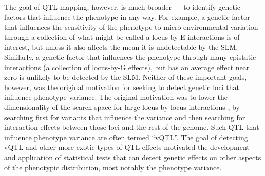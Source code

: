 
The goal of QTL mapping, however, is much broader --- to identify genetic factors that influence the phenotype in any way.
For example, a genetic factor that influences the sensitivity of the phenotype to micro-environmental variation through a collection of what might be called a locus-by-E interactions is of interest, but unless it also affects the mean it is undetectable by the SLM.
Similarly, a genetic factor that influences the phenotype through many epistatic interactions (a collection of locus-by-G effects), but has an average effect near zero is unlikely to be detected by the SLM.
Neither of these important goals, however, was the original motivation for seeking to detect genetic loci that influence phenotype variance.
The original motivation was to lower the dimensionality of the search space for large locus-by-locus interactions \citep{Pare2010}, by searching first for variants that influence the variance and then searching for interaction effects between those loci and the rest of the genome.
Such QTL that influence phenotype variance are often termed ``vQTL''.
The goal of detecting vQTL and other more exotic types of QTL effects motivated the development and application of statistical tests that can detect genetic effects on other aspects of the phenotypic distribution, most notably the phenotype variance.

